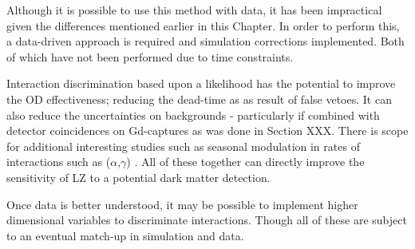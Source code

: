 \par
Although it is possible to use this method with data, it has been impractical given the differences mentioned earlier in this Chapter.
In order to perform this, a data-driven approach is required and simulation corrections implemented.
Both of which have not been performed due to time constraints.





\par
Interaction discrimination based upon a likelihood has the potential to improve the OD effectiveness; reducing the dead-time as as result of false vetoes.
It can also reduce the uncertainties on backgrounds - particularly if combined with detector coincidences on Gd-captures as was done in Section XXX.
There is scope for additional interesting studies such as seasonal modulation in rates of interactions such as ($\alpha$,$\gamma$) \cite{cavern_gammas_in_Soudan_mine_ref}.
All of these together can directly improve the sensitivity of LZ to a potential dark matter detection.

\par
Once data is better understood, it may be possible to implement higher dimensional variables to discriminate interactions.
Though all of these are subject to an eventual match-up in simulation and data.
